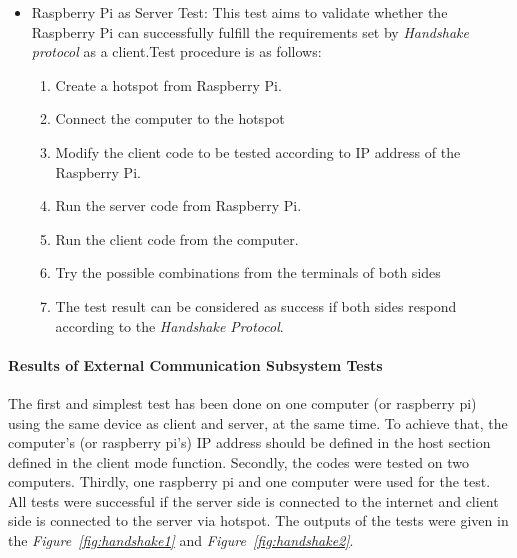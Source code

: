 \documentclass[a4paper,12pt]{article}
\begin{document}
\begin{itemize}
		\item Raspberry Pi as Server Test:
			This test aims to validate whether the Raspberry Pi can successfully fulfill the requirements set by \textit{Handshake protocol} as a client.Test procedure is as follows:
			\begin{enumerate}
				\item Create a hotspot from Raspberry Pi. \vspace{-0.2cm}
				\item Connect the computer to the hotspot \vspace{-0.2cm}
				\item Modify the client code to be tested according to IP address of the Raspberry Pi. \vspace{-0.2cm}
				\item Run the server code from Raspberry Pi. \vspace{-0.2cm}
				\item Run the client code from the computer. \vspace{-0.2cm}
				\item Try the possible combinations from the terminals of both sides \vspace{-0.2cm}
				\item The test result can be considered as success if both sides respond according to the \textit{Handshake Protocol}. 
			\end{enumerate}	
		
		\end{itemize}
		

	\paragraph{Results of External Communication Subsystem Tests}
	
	 The first and simplest test has been done on one computer (or raspberry pi) using the same device as client and server, at the same time. To achieve that, the computer's (or raspberry pi’s) IP address should be defined in the host section defined in the client mode function. Secondly, the codes were tested on two computers. Thirdly, one raspberry pi and one computer were used for the test. All tests were successful if the server side is connected to the internet and client side is connected to the server via hotspot. The outputs of the tests were given in the \textit{Figure~\ref{fig:handshake1}} and \textit{Figure~\ref{fig:handshake2}}.
	
	
	
\end{document}
